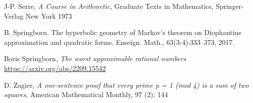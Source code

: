 \documentclass[12pt,a4paper]{amsart}
\begin{document}
J-P. Serre,
\textit{A Course in Arithmetic},
Graduate Texts in Mathematics,
Springer-Verlag New York
1973


B. Springborn. The hyperbolic geometry of Markov’s theorem on Diophantine
approximation and quadratic forms. Enseign. Math., 63(3-4):333–373, 2017.

Boris Springborn,
\textit{The worst approximable rational numbers}
\url{https://arxiv.org/abs/2209.15542}




D. Zagier,
 \textit{A one-sentence proof that every prime p = 1 (mod 4) is a sum of two squares}, 
 American Mathematical Monthly, 97 (2): 144
 
 
\end{document}

